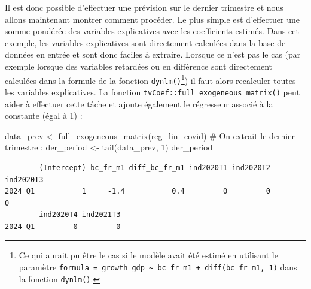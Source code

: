 \documentclass[
  a4paper,
  DIV=11,
  numbers=noendperiod,
  french]{scrartcl}
\newenvironment{Shaded}{\begin{snugshade}}{\end{snugshade}}
\newcommand{\CommentTok}[1]{\textcolor[rgb]{0.37,0.37,0.37}{#1}}
\newcommand{\DecValTok}[1]{\textcolor[rgb]{0.68,0.00,0.00}{#1}}
\newcommand{\FunctionTok}[1]{\textcolor[rgb]{0.28,0.35,0.67}{#1}}
\newcommand{\NormalTok}[1]{\textcolor[rgb]{0.00,0.23,0.31}{#1}}
\newcommand{\OtherTok}[1]{\textcolor[rgb]{0.00,0.23,0.31}{#1}}
\newcommand\1{{\mathds 1}}
\theoremstyle{remark}
\begin{document}
Il est donc possible d'effectuer une prévision sur le dernier trimestre
et nous allons maintenant montrer comment procéder. Le plus simple est
d'effectuer une somme pondérée des variables explicatives avec les
coefficients estimés. Dans cet exemple, les variables explicatives sont
directement calculées dans la base de données en entrée et sont donc
faciles à extraire. Lorsque ce n'est pas le cas (par exemple lorsque des
variables retardées ou en différence sont directement calculées dans la
formule de la fonction \texttt{dynlm()}\footnote{ Ce qui aurait pu être
  le cas si le modèle avait été estimé en utilisant le paramètre
  \texttt{formula\ =\ growth\_gdp\ \textasciitilde{}\ bc\_fr\_m1\ +\ diff(bc\_fr\_m1,\ 1)}
  dans la fonction \texttt{dynlm()}.}) il faut alors recalculer toutes
les variables explicatives. La fonction
\texttt{tvCoef::full\_exogeneous\_matrix()} peut aider à effectuer cette
tâche et ajoute également le régresseur associé à la constante (égal à
1) :

\begin{Shaded}
\begin{Highlighting}[]
\NormalTok{data\_prev }\OtherTok{\textless{}{-}} \FunctionTok{full\_exogeneous\_matrix}\NormalTok{(reg\_lin\_covid)}
\CommentTok{\# On extrait le dernier trimestre :}
\NormalTok{der\_period }\OtherTok{\textless{}{-}} \FunctionTok{tail}\NormalTok{(data\_prev, }\DecValTok{1}\NormalTok{)}
\NormalTok{der\_period}
\end{Highlighting}
\end{Shaded}

\begin{verbatim}
        (Intercept) bc_fr_m1 diff_bc_fr_m1 ind2020T1 ind2020T2 ind2020T3
2024 Q1           1     -1.4           0.4         0         0         0
        ind2020T4 ind2021T3
2024 Q1         0         0
\end{verbatim}
\end{document}
